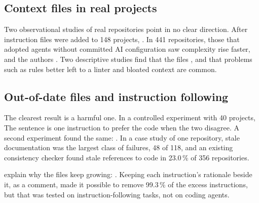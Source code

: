 \subsection{Context files in real projects}

Two observational studies of real repositories point in no clear direction.
After instruction files were added to 148 projects,
.
In 441 repositories, those that adopted agents without committed AI
configuration saw complexity rise faster, and the authors .
Two descriptive studies find that the files , and that problems such as rules better left to a linter and
bloated context are common\autocite{dossantos2026smells}.

\subsection{Out-of-date files and instruction following}

The clearest result is a harmful one.
In a controlled experiment with 40 projects, 
The sentence is one instruction to prefer the code when the two disagree.
A second experiment found the same: .
In a case study of one repository, stale documentation was the largest class of
failures, 48 of 118\autocite{aliabadi2026lessons}, and an existing consistency
checker found stale references to code in 23.0\,\% of 356
repositories\autocite{treude2026contextrot}.

\Textcite{chakrabarti2026growing} explain why the files keep growing:
.
Keeping each instruction's rationale beside it, as a comment, made it possible
to remove 99.3\,\% of the excess instructions, but that was tested on
instruction-following tasks, not on coding agents.

